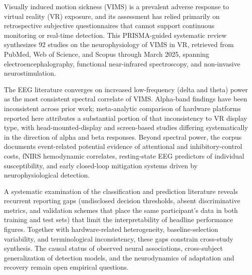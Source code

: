 Visually induced motion sickness (VIMS) is a prevalent adverse response to virtual reality (VR) exposure, and its assessment has relied primarily on retrospective subjective questionnaires that cannot support continuous monitoring or real-time detection.
This PRISMA-guided systematic review synthesizes 92 studies on the neurophysiology of VIMS in VR, retrieved from PubMed, Web of Science, and Scopus through March 2025, spanning electroencephalography, functional near-infrared spectroscopy, and non-invasive neurostimulation.

The EEG literature converges on increased low-frequency (delta and theta) power as the most consistent spectral correlate of VIMS.
Alpha-band findings have been inconsistent across prior work; meta-analytic comparison of hardware platforms reported here attributes a substantial portion of that inconsistency to VR display type, with head-mounted-display and screen-based studies differing systematically in the direction of alpha and beta responses.
Beyond spectral power, the corpus documents event-related potential evidence of attentional and inhibitory-control costs, fNIRS hemodynamic correlates, resting-state EEG predictors of individual susceptibility, and early closed-loop mitigation systems driven by neurophysiological detection.

A systematic examination of the classification and prediction literature reveals recurrent reporting gaps (undisclosed decision thresholds, absent discriminative metrics, and validation schemes that place the same participant's data in both training and test sets) that limit the interpretability of headline performance figures.
Together with hardware-related heterogeneity, baseline-selection variability, and terminological inconsistency, these gaps constrain cross-study synthesis.
The causal status of observed neural associations, cross-subject generalization of detection models, and the neurodynamics of adaptation and recovery remain open empirical questions.
